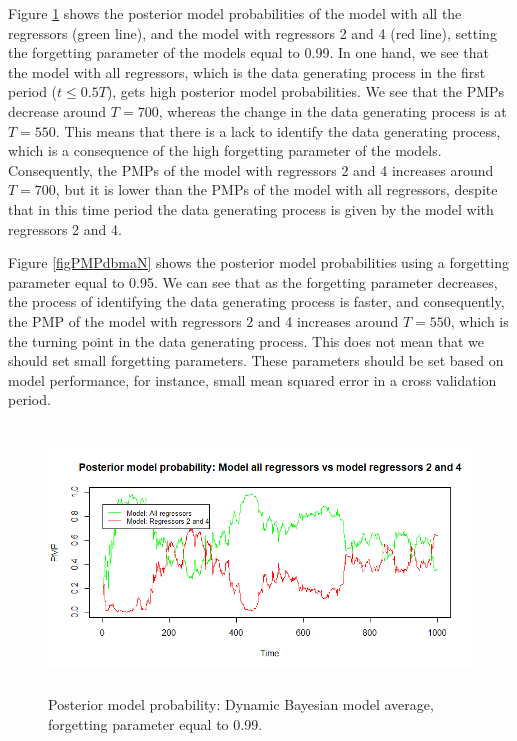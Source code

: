 \begin{enumerate}[leftmargin=*]
Figure \ref{figPMPdbma} shows the posterior model probabilities of the model with all the regressors (green line), and the model with regressors 2 and 4 (red line), setting the forgetting parameter of the models equal to 0.99. In one hand, we see that the model with all regressors, which is the data generating process in the first period ($t\leq 0.5T$), gets high posterior model probabilities. We see that the PMPs decrease around $T=700$, whereas the change in the data generating process is at $T=550$. This means that there is a lack to identify the data generating process, which is a consequence of the high forgetting parameter of the models. Consequently, the PMPs of the model with regressors 2 and 4 increases around $T=700$, but it is lower than the PMPs of the model with all regressors, despite that in this time period the data generating process is given by the model with regressors 2 and 4. 

Figure \ref{figPMPdbmaN} shows the posterior model probabilities using a forgetting parameter equal to 0.95. We can see that as the forgetting parameter decreases, the process of identifying the data generating process is faster, and consequently, the PMP of the model with regressors 2 and 4 increases around $T=550$, which is the turning point in the data generating process. This does not mean that we should set small forgetting parameters. These parameters should be set based on model performance, for instance, small mean squared error in a cross validation period.

\begin{figure}[!h]
	\includegraphics[width=340pt, height=200pt]{Chapters/chapter10/figures/dbmalogit.png}
	\caption[List of figure caption goes here]{Posterior model probability: Dynamic Bayesian model average, forgetting parameter equal to 0.99.}\label{figPMPdbma}
\end{figure}


\end{enumerate}
